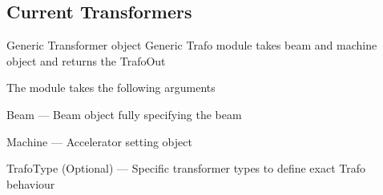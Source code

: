 \documentclass[letterpaper,10pt,english]{sphinxmanual}
\begin{document}
\subsection{Current Transformers}
\label{device_modules:current-transformers}
Generic Transformer object
\label{device_modules:module-TrafoModule}
Generic Trafo module takes beam and machine object and returns the TrafoOut

The module takes the following arguments

Beam --- Beam object fully specifying the beam

Machine --- Accelerator setting object

TrafoType (Optional) --- Specific transformer types to define exact Trafo behaviour
\end{document}
